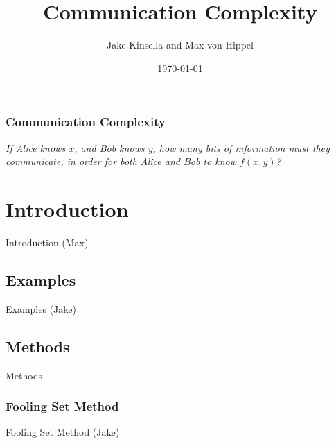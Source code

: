 \documentclass{beamer}
\title{Communication Complexity}
\author{Jake Kinsella and Max von Hippel}
\institute{Northeastern University}
\date{\today}
\begin{document}
\frame{\titlepage}

\begin{frame}
\frametitle{Communication Complexity}
\emph{If Alice knows $x$, and Bob knows $y$, how many bits of information must they communicate, in order for both Alice and Bob to know $f(x, y)$?}
\end{frame}

\begin{frame}
\tableofcontents
\end{frame}


\section{Introduction}

\begin{frame}{Introduction (Max)}
\TODO
\end{frame}

\subsection{Examples}

\begin{frame}{Examples (Jake)}
\TODO
\end{frame}

\subsection{Methods}

\begin{frame}{Methods}
\TODO
\tableofcontents[currentsection]
\end{frame}

\subsubsection{Fooling Set Method}

\begin{frame}{Fooling Set Method (Jake)}
\TODO
\end{frame}
\end{document}
